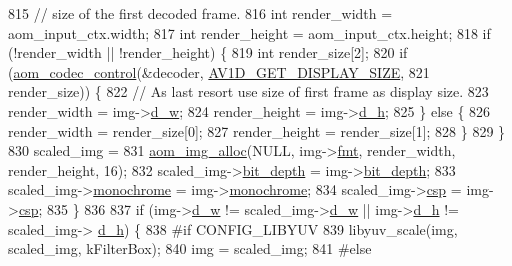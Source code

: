 \begin{DoxyCodeInclude}
{{{{{{{{{{{{{{{{{{{{{{{{{{{{{{{{{{{{{{{{{{{{{{815             \textcolor{comment}{// size of the first decoded frame.}
816             \textcolor{keywordtype}{int} render\_width = aom\_input\_ctx.width;
817             \textcolor{keywordtype}{int} render\_height = aom\_input\_ctx.height;
818             \textcolor{keywordflow}{if} (!render\_width || !render\_height) \{
819               \textcolor{keywordtype}{int} render\_size[2];
820               \textcolor{keywordflow}{if} (\hyperlink{group__codec_ga6da974f4eeaba1fa74106b28d0fe6ac5}{aom\_codec\_control}(&decoder, 
      \hyperlink{group__aom__decoder_gga3865fd4b3192489baa9a5c3632ebe97ba592a5d1390204d743ddfe7bfe8ef177c}{AV1D\_GET\_DISPLAY\_SIZE},
821                                     render\_size)) \{
822                 \textcolor{comment}{// As last resort use size of first frame as display size.}
823                 render\_width = img->\hyperlink{structaom__image_a89f80b1f58d608b9d2080635f4359034}{d\_w};
824                 render\_height = img->\hyperlink{structaom__image_ab986419a1f0fff93a2dc505f47194988}{d\_h};
825               \} \textcolor{keywordflow}{else} \{
826                 render\_width = render\_size[0];
827                 render\_height = render\_size[1];
828               \}
829             \}
830             scaled\_img =
831                 \hyperlink{aom__image_8h_a570db29fbd122951235a08fe9375f6bb}{aom\_img\_alloc}(NULL, img->\hyperlink{structaom__image_a6c64b1ab918d80d52eb8f5d6d957e825}{fmt}, render\_width, render\_height, 16);
832             scaled\_img->\hyperlink{structaom__image_a46ed9ffd741938d306a0db5a24bdcf8e}{bit\_depth} = img->\hyperlink{structaom__image_a46ed9ffd741938d306a0db5a24bdcf8e}{bit\_depth};
833             scaled\_img->\hyperlink{structaom__image_ab7886616025ff8bd0bb96d967fca9ad8}{monochrome} = img->\hyperlink{structaom__image_ab7886616025ff8bd0bb96d967fca9ad8}{monochrome};
834             scaled\_img->\hyperlink{structaom__image_a4f235c521bc95a061e9e0b2a3d5d457e}{csp} = img->\hyperlink{structaom__image_a4f235c521bc95a061e9e0b2a3d5d457e}{csp};
835           \}
836 
837           \textcolor{keywordflow}{if} (img->\hyperlink{structaom__image_a89f80b1f58d608b9d2080635f4359034}{d\_w} != scaled\_img->\hyperlink{structaom__image_a89f80b1f58d608b9d2080635f4359034}{d\_w} || img->\hyperlink{structaom__image_ab986419a1f0fff93a2dc505f47194988}{d\_h} != scaled\_img->
      \hyperlink{structaom__image_ab986419a1f0fff93a2dc505f47194988}{d\_h}) \{
838 \textcolor{preprocessor}{#if CONFIG\_LIBYUV}
839             libyuv\_scale(img, scaled\_img, kFilterBox);
840             img = scaled\_img;
841 \textcolor{preprocessor}{#else}
}}}}}}}}}}}}}}}}}}}}}}}}}}}}}}}}}}}}}}}}}}}}}}
\end{DoxyCodeInclude}
